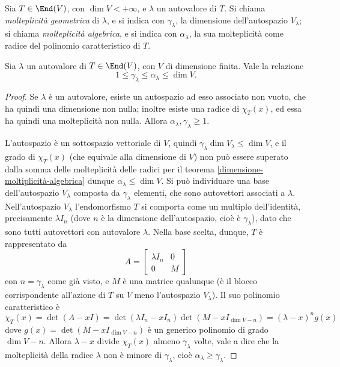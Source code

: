 \begin{definizione} \label{d:molteplicita-autovalori}
	Sia $T\in\End(V)$, con $\dim V<+\infty$, e $\lambda$ un autovalore di $T$.
	Si chiama \emph{molteplicità geometrica} di $\lambda$, e si indica con $\gamma_\lambda$, la dimensione dell'autospazio $V_\lambda$; si chiama \emph{molteplicità algebrica}, e si indica con $\alpha_\lambda$, la sua molteplicità come radice del polinomio caratteristico di $T$.
\end{definizione}
\begin{teorema}
	Sia $\lambda$ un autovalore di $T\in\End(V)$, con $V$ di dimensione finita.
	Vale la relazione
	\begin{equation*}
		1\leq\gamma_\lambda\leq\alpha_\lambda\leq\dim V.
	\end{equation*}
\end{teorema}
\begin{proof}
	Se $\lambda$ è un autovalore, esiste un autospazio ad esso associato non vuoto, che ha quindi una dimensione non nulla; inoltre esiste una radice di $\chi_T(x)$, ed essa ha quindi una molteplicità non nulla.
	Allora $\alpha_\lambda,\gamma_\lambda\geq 1$.

	L'autospazio è un sottospazio vettoriale di $V$, quindi $\gamma_\lambda\dim V_\lambda\leq\dim V$, e il grado di $\chi_T(x)$ (che equivale alla dimensione di $V$) non può essere superato dalla somma delle molteplicità delle radici per il teorema \ref{dimensione-moltiplicità-algebrica} dunque $\alpha_\lambda\le\dim V$.
	Si può individuare una base dell'autospazio $V_\lambda$ composta da $\gamma_\lambda$ elementi, che sono autovettori associati a $\lambda$.
	Nell'autospazio $V_\lambda$ l'endomorfismo $T$ si comporta come un multiplo dell'identità, precisamente $\lambda I_n$ (dove $n$ è la dimensione dell'autospazio, cioè è $\gamma_\lambda$), dato che sono tutti autovettori con autovalore $\lambda$.
	Nella base scelta, dunque, $T$ è rappresentato da
	\begin{equation*}
		A=
		\begin{bmatrix}
			\lambda I_n & 0\\
			0			& M
		\end{bmatrix}
	\end{equation*}
	con $n=\gamma_\lambda$ come già visto, e $M$ è una matrice qualunque (è il blocco corrispondente all'azione di $T$ su $V$ meno l'autospazio $V_\lambda$).
	Il suo polinomio caratteristico è $\chi_T(x)=\det(A-xI)=\det(\lambda I_n-xI_n)\det(M-xI_{\dim V-n})=(\lambda-x)^ng(x)$ dove $g(x)=\det(M-xI_{\dim V-n})$ è un generico polinomio di grado $\dim V-n$.
	Allora $\lambda-x$ divide $\chi_T(x)$ almeno $\gamma_\lambda$ volte, vale a dire che la molteplicità della radice $\lambda$ non è minore di $\gamma_\lambda$, cioè $\alpha_\lambda\ge\gamma_\lambda$.
\end{proof}

